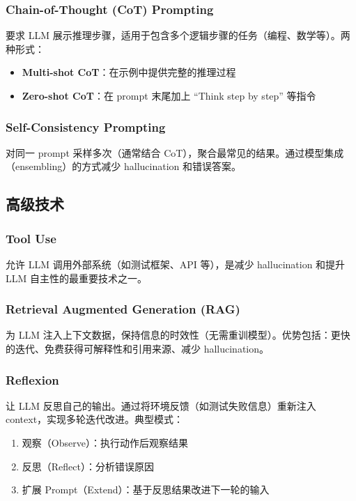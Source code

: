 \documentclass[a4paper]{article}
\begin{document}
\subsubsection{Chain-of-Thought (CoT) Prompting}

要求 LLM 展示推理步骤，适用于包含多个逻辑步骤的任务（编程、数学等）。两种形式：
\begin{itemize}
    \item \textbf{Multi-shot CoT}：在示例中提供完整的推理过程
    \item \textbf{Zero-shot CoT}：在 prompt 末尾加上 ``Think step by step'' 等指令
\end{itemize}

\subsubsection{Self-Consistency Prompting}

对同一 prompt 采样多次（通常结合 CoT），聚合最常见的结果。通过模型集成（ensembling）的方式减少 hallucination 和错误答案。

\subsection{高级技术}

\subsubsection{Tool Use}

允许 LLM 调用外部系统（如测试框架、API 等），是减少 hallucination 和提升 LLM 自主性的最重要技术之一。

\subsubsection{Retrieval Augmented Generation (RAG)}

为 LLM 注入上下文数据，保持信息的时效性（无需重训模型）。优势包括：更快的迭代、免费获得可解释性和引用来源、减少 hallucination。

\subsubsection{Reflexion}

让 LLM 反思自己的输出。通过将环境反馈（如测试失败信息）重新注入 context，实现多轮迭代改进。典型模式：
\begin{enumerate}
    \item 观察（Observe）：执行动作后观察结果
    \item 反思（Reflect）：分析错误原因
    \item 扩展 Prompt（Extend）：基于反思结果改进下一轮的输入
\end{enumerate}
\end{document}
